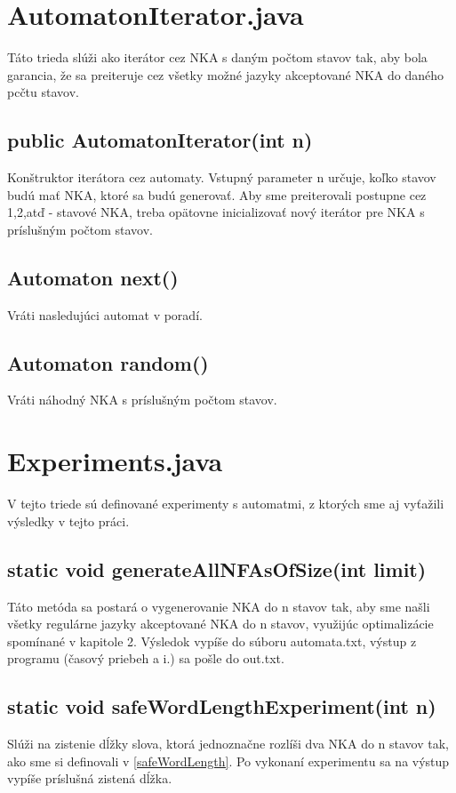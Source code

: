 \section{AutomatonIterator.java}
Táto trieda slúži ako iterátor cez NKA s daným počtom stavov tak, aby bola garancia, že sa preiteruje cez všetky možné jazyky akceptované NKA do daného pcčtu stavov.

\subsection*{public AutomatonIterator(int n)}
Konštruktor iterátora cez automaty. Vstupný parameter n určuje, koľko stavov budú mať NKA, ktoré sa budú generovať. Aby sme preiterovali postupne cez 1,2,atď - stavové NKA, treba opätovne inicializovať nový iterátor pre NKA s príslušným počtom stavov.

\subsection*{Automaton next()}
Vráti nasledujúci automat v poradí.

\subsection*{Automaton random()}
Vráti náhodný NKA s príslušným počtom stavov.

\section{Experiments.java}
V tejto triede sú definované experimenty s automatmi, z ktorých sme aj vyťažili výsledky v tejto práci.

\subsection*{static void generateAllNFAsOfSize(int limit)}
Táto metóda sa postará o vygenerovanie NKA do n stavov tak, aby sme našli všetky regulárne jazyky akceptované NKA do n stavov, využijúc optimalizácie spomínané v kapitole 2. Výsledok vypíše do súboru automata.txt, výstup z programu (časový priebeh a i.) sa pošle do out.txt.

\subsection*{static void safeWordLengthExperiment(int n)}
Slúži na zistenie dĺžky slova, ktorá jednoznačne rozlíši dva NKA do n stavov tak, ako sme si definovali v \ref{safeWordLength}. Po vykonaní experimentu sa na výstup vypíše príslušná zistená dĺžka.


